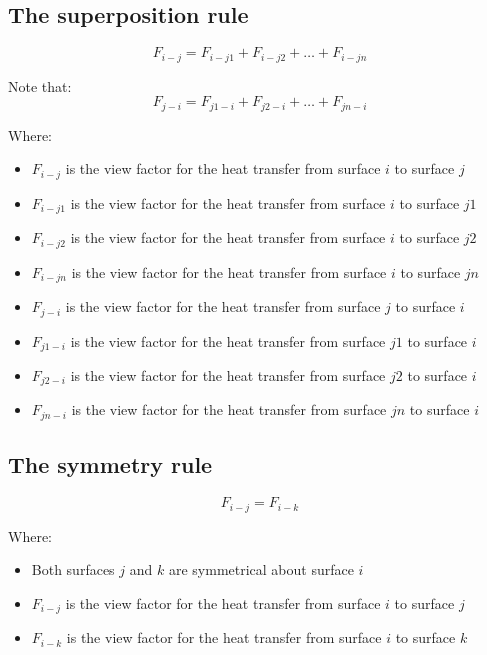 \documentclass[11pt]{article}
\begin{document}
 \newpage
\subsection{The superposition rule}
\label{sec:org195319c}
\[F_{i-j} = F_{i-j1} + F_{i-j2} + \ldots + F_{i-jn}\]

Note that:
\[F_{j-i} = F_{j1-i} + F_{j2-i} + \ldots + F_{jn-i}\]

Where:
\begin{itemize}
\item \(F_{i-j}\) is the view factor for the heat transfer from surface \(i\) to surface \(j\)
\item \(F_{i-j1}\) is the view factor for the heat transfer from surface \(i\) to surface \(j1\)
\item \(F_{i-j2}\) is the view factor for the heat transfer from surface \(i\) to surface \(j2\)
\item \(F_{i-jn}\) is the view factor for the heat transfer from surface \(i\) to surface \(jn\)
\item \(F_{j-i}\) is the view factor for the heat transfer from surface \(j\) to surface \(i\)
\item \(F_{j1-i}\) is the view factor for the heat transfer from surface \(j1\) to surface \(i\)
\item \(F_{j2-i}\) is the view factor for the heat transfer from surface \(j2\) to surface \(i\)
\item \(F_{jn-i}\) is the view factor for the heat transfer from surface \(jn\) to surface \(i\)
\end{itemize}

 \newpage
\subsection{The symmetry rule}
\label{sec:org5e31d0e}
\[F_{i-j} = F_{i-k}\]

Where:
\begin{itemize}
\item Both surfaces \(j\) and \(k\) are symmetrical about surface \(i\)
\item \(F_{i-j}\) is the view factor for the heat transfer from surface \(i\) to surface \(j\)
\item \(F_{i-k}\) is the view factor for the heat transfer from surface \(i\) to surface \(k\)
\end{itemize}
\end{document}
